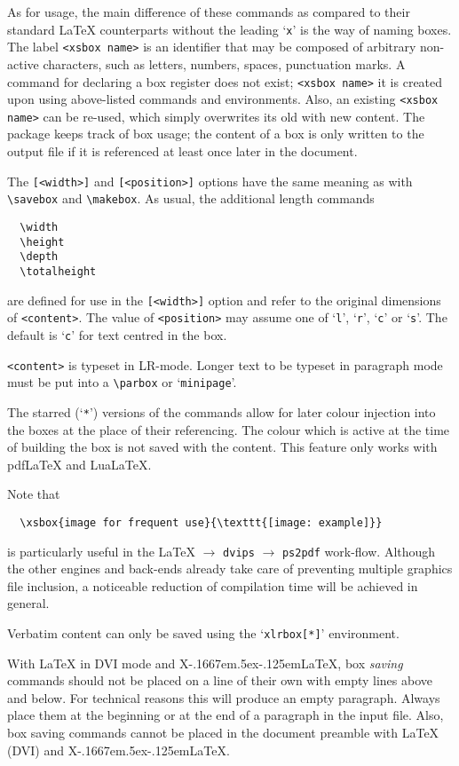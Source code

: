 \documentclass[a4paper]{article}
\def\XeLaTeX{X\kern-.1667em\lower.5ex\hbox{\reflectbox{E}}\kern-.125em\LaTeX}
\begin{document}
As for usage, the main difference of these commands as compared to their standard \LaTeX{} counterparts without the leading `\verb+x+' is the way of naming boxes. The label \verb+<xsbox name>+ is an identifier that may be composed of arbitrary non-active characters, such as letters, numbers, spaces, punctuation marks. A command for declaring a box register does not exist; \verb+<xsbox name>+ it is created upon using above-listed commands and environments. Also, an existing \verb+<xsbox name>+ can be re-used, which simply overwrites its old with new content. The package keeps track of box usage; the content of a box is only written to the output file if it is referenced at least once later in the document.

The \verb+[<width>]+ and \verb+[<position>]+ options have the same meaning as with \verb+\savebox+ and \verb+\makebox+. As usual, the additional length commands
\begin{Verbatim}
  \width
  \height
  \depth
  \totalheight
\end{Verbatim}
are defined for use in the \verb+[<width>]+ option and refer to the original dimensions of \verb+<content>+. The value of \verb+<position>+ may assume one of `\verb+l+', `\verb+r+', `\verb+c+' or `\verb+s+'. The default is `\verb+c+' for text centred in the box.

\verb+<content>+ is typeset in LR-mode. Longer text to be typeset in paragraph mode must be put into a \verb+\parbox+ or `\verb+minipage+'.

The starred (`\verb+*+') versions of the commands allow for later colour injection into the boxes at the place of their referencing. The colour which is active at the time of building the box is not saved with the content. This feature only works with pdf\LaTeX{} and Lua\LaTeX.

Note that
\begin{Verbatim}
  \xsbox{image for frequent use}{\texttt{[image: example]}}  
\end{Verbatim}
is particularly useful in the \LaTeX{} $\rightarrow$ \verb+dvips+ $\rightarrow$ \verb+ps2pdf+ work-flow. Although the other engines and back-ends already take care of preventing multiple graphics file inclusion, a noticeable reduction of compilation time will be achieved in general.

Verbatim content can only be saved using the `\verb+xlrbox[*]+' environment.

With \LaTeX{} in DVI mode and \XeLaTeX, box \emph{saving} commands should not be placed on a line of their own with empty lines above and below. For technical reasons this will produce an empty paragraph. Always place them at the beginning or at the end of a paragraph in the input file. Also, box saving commands cannot be placed in the document preamble with \LaTeX{} (DVI) and \XeLaTeX{}.
\end{document}
